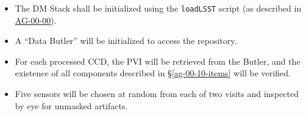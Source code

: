 \begin{itemize}

  \item{The DM Stack shall be initialized using the \texttt{loadLSST} script
  (as described in \hyperref[ag-00-00]{AG-00-00}).}

  \item{A ``Data Butler'' will be initialized to access the repository.}

  \item{For each processed CCD, the PVI will be retrieved from the Butler, and
  the existence of all components described in \S\ref{ag-00-10-items} will be
  verified.}

  \item{Five sensors will be chosen at random from each of two visits and inspected by eye for unmasked artifacts.}

\end{itemize}

